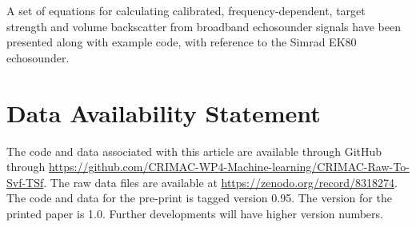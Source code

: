 \documentclass[preprint,12pt,TurnOnLineNumbers]{JASAnew}
\newcommand{\ek}{Simrad EK80}
\begin{document}
A set of equations for calculating calibrated, frequency-dependent, target strength and volume backscatter from broadband echosounder signals have been presented along with example code, with reference to the \ek{} echosounder.

\section{Data Availability Statement} \label{dataavstatement}

The code and data associated with this article are available through GitHub through \url{https://github.com/CRIMAC-WP4-Machine-learning/CRIMAC-Raw-To-Svf-TSf}. The raw data files are available at \url{https://zenodo.org/record/8318274}. The code and data for the pre-print is tagged version 0.95. The version for the printed paper is 1.0. Further developments will have higher version numbers.


\end{document}
